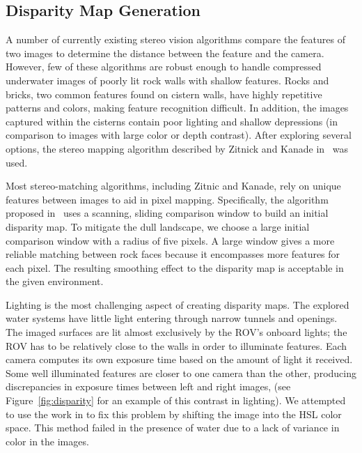 \documentclass{llncs}
\begin{document}
\subsection{Disparity Map Generation}
\label{disparityMapGeneration}
\noindent A number of currently existing stereo vision algorithms compare the features of two images to determine the distance between the feature and the camera. However, few of these algorithms are robust enough to handle compressed underwater images of poorly lit rock walls with shallow features. Rocks and bricks, two common features found on cistern walls, have highly repetitive patterns and colors, making feature recognition difficult. In addition, the images captured within the cisterns contain poor lighting and shallow depressions (in comparison to images with large color or depth contrast). After exploring several options, the stereo mapping algorithm described by Zitnick and Kanade in~\cite{stereo:zitKan} was used.

Most stereo-matching algorithms, including Zitnic and Kanade, rely on unique features between images to aid in pixel mapping. Specifically, the algorithm proposed in~\cite{stereo:zitKan} uses a scanning, sliding comparison window to build an initial disparity map. To mitigate the dull landscape, we choose a large initial comparison window with a radius of five pixels. A large window gives a more reliable matching between rock faces because it encompasses more features for each pixel. The resulting smoothing effect to the disparity map is acceptable in the given environment.

Lighting is the most challenging aspect of creating disparity maps. The explored water systems have little light entering through narrow tunnels and openings. The imaged surfaces are lit almost exclusively by the ROV's onboard lights; the ROV has to be relatively close to the walls in order to illuminate features. Each camera computes its own exposure time based on the amount of light it received. Some well illuminated features are closer to one camera than the other, producing discrepancies in exposure times between left and right images, (see Figure~\ref{fig:disparity} for an example of this contrast in lighting). We attempted to use the work in \cite{stereo:nalGast} to fix this problem by shifting the image into the HSL color space. This method failed in the presence of water due to a lack of variance in color in the images.
\end{document}
